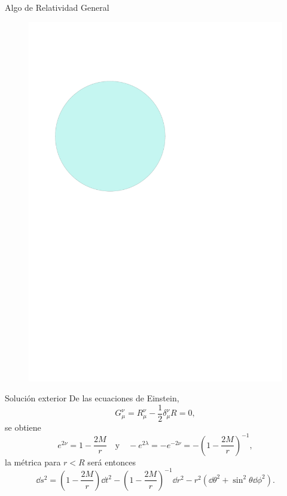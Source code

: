 \documentclass[11pt]{beamer}
\begin{document}
\begin{frame}{Algo de Relatividad General}
    \begin{figure}
        \centering
        \includegraphics[page=4,scale=0.65]{GR.pdf}
    \end{figure}
\end{frame}

\begin{frame}{Solución exterior}
    De las ecuaciones de Einstein,
    \begin{equation}
        G _ { \mu } ^ { \nu } = R _ { \mu } ^ { \nu } - \frac { 1 } { 2 } \delta _ { \mu } ^ { \nu } R = 0,
    \end{equation}
    se obtiene
    \begin{equation}
        e ^ { 2 \nu } = 1 - \frac { 2 M } { r }\quad \text{y}\quad - e ^ { 2 \lambda } = - e ^ { - 2 \nu } = - \left( 1 - \frac { 2 M } { r } \right) ^ { - 1 },
    \end{equation}
    la métrica para $r<R$ será entonces
    \begin{equation}
        \dd{s} ^ { 2 } =  \left( 1 - \frac { 2 M } { r } \right) \dd{t} ^ { 2 } - \left( 1 - \frac { 2 M } { r } \right) ^ { - 1 } \dd{r} ^ { 2 }  - r ^ { 2 }\left( \dd{\theta} ^ { 2 } +  \sin ^ { 2 } \theta \dd{\phi} ^ { 2 } \right).
    \end{equation}
    
    \hyperlink{extsol}{}
\end{frame}
\end{document}
